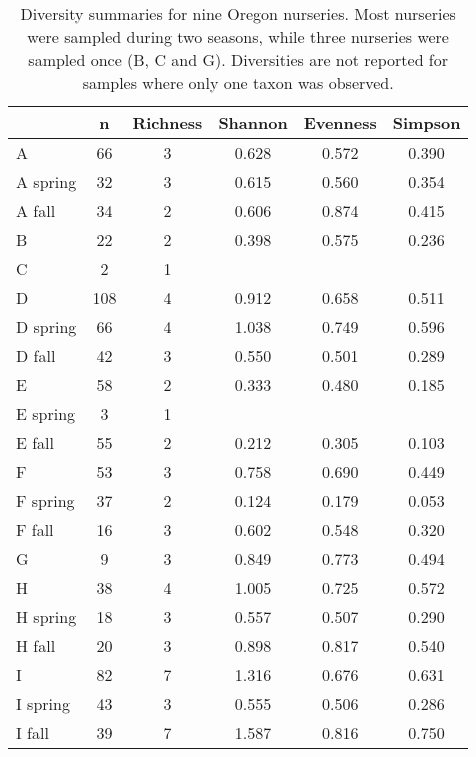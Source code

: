 \documentclass[12pt]{article}
\begin{document}
\begin{table}[ht]
\centering
\caption{Diversity summaries for nine Oregon nurseries.  Most nurseries were sampled during two seasons, while three nurseries were sampled once (B, C and G). Diversities are not reported for samples where only one taxon was observed.} 
\label{tab:div}
\begin{tabular}{lccccc}
  \hline
 & \textbf{n} & \textbf{Richness} & \textbf{Shannon} & \textbf{Evenness} & \textbf{Simpson} \\ 
  \hline
A & 66 & 3 & 0.628 & 0.572 & 0.390 \\ 
  A spring & 32 & 3 & 0.615 & 0.560 & 0.354 \\ 
  A fall & 34 & 2 & 0.606 & 0.874 & 0.415 \\ 
  B & 22 & 2 & 0.398 & 0.575 & 0.236 \\ 
  C & 2 & 1 &  &  &  \\ 
  D & 108 & 4 & 0.912 & 0.658 & 0.511 \\ 
  D spring & 66 & 4 & 1.038 & 0.749 & 0.596 \\ 
  D fall & 42 & 3 & 0.550 & 0.501 & 0.289 \\ 
  E & 58 & 2 & 0.333 & 0.480 & 0.185 \\ 
  E spring & 3 & 1 &  &  &  \\ 
  E fall & 55 & 2 & 0.212 & 0.305 & 0.103 \\ 
  F & 53 & 3 & 0.758 & 0.690 & 0.449 \\ 
  F spring & 37 & 2 & 0.124 & 0.179 & 0.053 \\ 
  F fall & 16 & 3 & 0.602 & 0.548 & 0.320 \\ 
  G & 9 & 3 & 0.849 & 0.773 & 0.494 \\ 
  H & 38 & 4 & 1.005 & 0.725 & 0.572 \\ 
  H spring & 18 & 3 & 0.557 & 0.507 & 0.290 \\ 
  H fall & 20 & 3 & 0.898 & 0.817 & 0.540 \\ 
  I & 82 & 7 & 1.316 & 0.676 & 0.631 \\ 
  I spring & 43 & 3 & 0.555 & 0.506 & 0.286 \\ 
  I fall & 39 & 7 & 1.587 & 0.816 & 0.750 \\ 
   \hline
\end{tabular}
\end{table}
\end{document}
